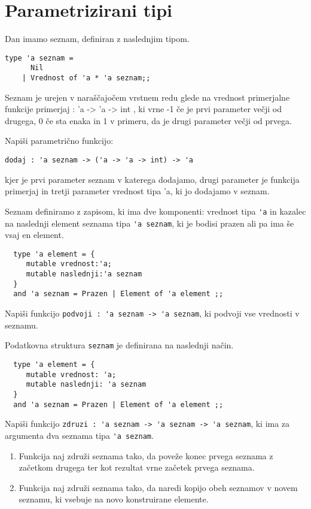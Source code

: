 \section{Parametrizirani tipi}
\begin{ex}
Dan imamo seznam, definiran z naslednjim tipom. 
\begin{lstlisting}
type 'a seznam = 
      Nil 
    | Vrednost of 'a * 'a seznam;; 
\end{lstlisting}

Seznam je urejen v nara\v s\v cajo\v cem vrstnem redu glede na vrednost primerjalne funkcije primerjaj : 'a -> 'a -> int , ki vrne -1 \v ce je prvi parameter ve\v cji od drugega, 0 \v ce sta enaka in 1 v primeru, da je drugi parameter ve\v cji od prvega.

Napi\v si parametri\v cno funkcijo:
\begin{lstlisting}
dodaj : 'a seznam -> ('a -> 'a -> int) -> 'a
\end{lstlisting}
kjer je prvi parameter seznam v katerega dodajamo, drugi parameter je funkcija primerjaj in tretji parameter vrednost tipa 'a, ki jo dodajamo v seznam.



\end{ex}
\begin{ex}
  Seznam definiramo z zapisom, ki ima dve komponenti: vrednost tipa
  \lstinline{'a} in kazalec na naslednji element seznama tipa \lstinline{'a seznam}, ki je bodisi prazen ali pa ima še vsaj en element.

\begin{lstlisting}
  type 'a element = { 
     mutable vrednost:'a; 
     mutable naslednji:'a seznam 
  }
  and 'a seznam = Prazen | Element of 'a element ;;
\end{lstlisting}

  Napi\v si funkcijo \lstinline{podvoji : 'a seznam -> 'a seznam}, ki
  podvoji vse vrednosti v seznamu.


\end{ex} 
\begin{ex}
  Podatkovna struktura \lstinline{seznam} je definirana na naslednji na\v
  cin.

\begin{lstlisting}
  type 'a element = { 
     mutable vrednost: 'a; 
     mutable naslednji: 'a seznam 
  }
  and 'a seznam = Prazen | Element of 'a element ;;
\end{lstlisting}

  Napi\v si funkcijo 
  \lstinline{zdruzi : 'a seznam -> 'a seznam -> 'a seznam}, ki ima za argumenta dva seznama tipa \lstinline{'a seznam}.

  \begin{enumerate}[label=(\roman*)]
  \item Funkcija naj zdru\v zi seznama tako, da pove\v ze konec prvega
    seznama z za\v cetkom drugega ter kot rezultat vrne za\v cetek prvega
    seznama.

  \item Funkcija naj zdru\v zi seznama tako, da naredi kopijo obeh
    seznamov v novem seznamu, ki vsebuje na novo konstruirane
    elemente.
  \end{enumerate}


\end{ex} 
